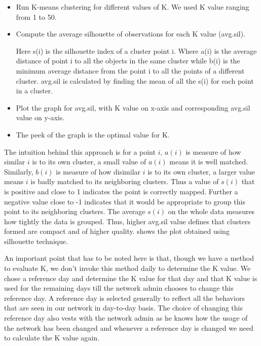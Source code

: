 		\begin{itemize}
		\item Run K-means clustering for different values of K. We used K value ranging from 1 to 50.
		\item Compute the average silhouette of observations for each K value (avg.sil).
		
		\begin{center}
		\end{center}
		Here s(i) is the silhouette index of a cluster point i. Where a(i) is the average distance of point i to all the objects in the same cluster while b(i) is the minimum average distance from the point i to all the points of a different cluster. avg.sil is calculated by finding the mean of all the s(i) for each point in a cluster.
		
		\item Plot the graph for avg.sil, with K value on x-axis and corresponding avg.sil value on y-axis.
		\item The peek of the graph is the optimal value for K.
	\end{itemize}
 
  The intuition behind this approach is for a point $i$, $ a(i)$ is  measure of how similar $i$ is to its own cluster, a small value of $ a(i)$ means it is well matched. Similarly, $b(i)$ is measure of how disimilar $i$ is to its own cluster, a larger value means $i$ is badly matched to its neighboring clusters. Thus a value of $s(i)$ that is positive and close to 1 indicates the point is correctly mapped. Further a negative value close to -1 indicates that it would be appropriate to group this point to its neighboring clusters. The average $s(i)$ on the whole data measures how tightly the data is grouped. Thus, higher avg.sil value defines that clusters formed are compact and of higher quality.  shows the plot obtained using silhouette technique. 
 
   An important point that has to be noted here is that, though we have a method to evaluate K, we don't invoke this method daily to determine the K value. We chose a reference day and determine the K value for that day and that K value is used for the remaining days till the network admin chooses to change this reference day. A reference day is selected generally to reflect all the behaviors that are seen in our network in day-to-day basis. The choice of changing this reference day also vests with the network admin as he knows how the usage of the network has been changed and whenever a reference day is changed we need to calculate the K value again.
   

